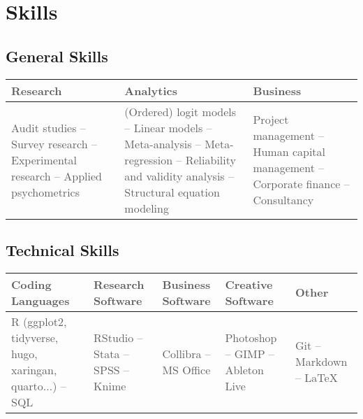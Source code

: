 \documentclass[11pt,a4paper,]{awesome-cv}
\begin{document}
\medskip

\hypertarget{skills}{%
\section{Skills}\label{skills}}

\medskip

\hypertarget{general-skills}{%
\subsection{General Skills}\label{general-skills}}

\begin{table}[H]
\centering\begingroup\fontsize{9}{11}\selectfont

\begin{tabular}{>{\centering\arraybackslash}p{5.2cm}>{\centering\arraybackslash}p{5.2cm}>{\centering\arraybackslash}p{5.2cm}}
\toprule
\textcolor[HTML]{5d5d5d}{\textbf{Research}} & \textcolor[HTML]{5d5d5d}{\textbf{Analytics}} & \textcolor[HTML]{5d5d5d}{\textbf{Business}}\\
\midrule
\textcolor[HTML]{5d5d5d}{Audit studies -- Survey research -- Experimental research -- Applied psychometrics} & \textcolor[HTML]{5d5d5d}{(Ordered) logit models -- Linear models -- Meta-analysis -- Meta-regression -- Reliability and validity analysis -- Structural equation modeling} & \textcolor[HTML]{5d5d5d}{Project management -- Human capital management -- Corporate finance -- Consultancy}\\
\bottomrule
\end{tabular}
\endgroup{}
\end{table}

\hypertarget{technical-skills}{%
\subsection{Technical Skills}\label{technical-skills}}

\begin{table}[H]
\centering\begingroup\fontsize{9}{11}\selectfont

\begin{tabular}{>{\centering\arraybackslash}p{2.96cm}>{\centering\arraybackslash}p{2.96cm}>{\centering\arraybackslash}p{2.96cm}>{\centering\arraybackslash}p{2.96cm}>{\centering\arraybackslash}p{2.96cm}}
\toprule
\textcolor[HTML]{5d5d5d}{\textbf{Coding Languages}} & \textcolor[HTML]{5d5d5d}{\textbf{Research Software}} & \textcolor[HTML]{5d5d5d}{\textbf{Business Software}} & \textcolor[HTML]{5d5d5d}{\textbf{Creative Software}} & \textcolor[HTML]{5d5d5d}{\textbf{Other}}\\
\midrule
\textcolor[HTML]{5d5d5d}{R (ggplot2, tidyverse, hugo, xaringan, quarto...) -- SQL} & \textcolor[HTML]{5d5d5d}{RStudio -- Stata -- SPSS -- Knime} & \textcolor[HTML]{5d5d5d}{Collibra -- MS Office} & \textcolor[HTML]{5d5d5d}{Photoshop -- GIMP -- Ableton Live} & \textcolor[HTML]{5d5d5d}{Git -- Markdown -- LaTeX}\\
\bottomrule
\end{tabular}
\endgroup{}
\end{table}
\end{document}
